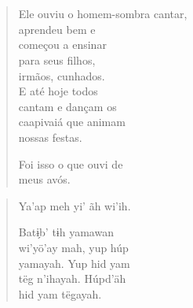 \chapter*{}

\mbox{}\vspace*{\fill}

\begin{verse}
Ele ouviu o homem-sombra cantar,\\
aprendeu bem e\\
começou a ensinar\\
para seus filhos,\\
irmãos, cunhados.\\
E até hoje todos\\
cantam e dançam os\\
caapivaiá que animam\\
nossas festas.

Foi isso o que ouvi de\\
meus avós.
\end{verse}

\begin{verse}
Ya’ap meh yi’ ãh wi’ih.

Batɨ̗b’ tɨh yamawan\\
wi’yö’ay mah, yup húp\\
yamayah. Yup hid yam\\
tëg n’ihayah. Húpd’äh\\
hid yam tëgayah.
\end{verse}

\vspace*{\fill}

